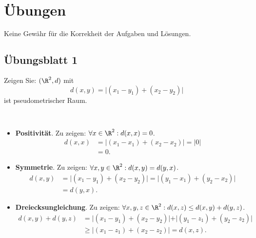 \chapter{Übungen}
Keine Gewähr für die Korrekheit der Aufgaben und Lösungen.

\section{Übungsblatt 1}
\setcounter{problemcounter}{0}

\begin{assignment}
  Zeigen Sie: \( (\R^2, d) \) mit
  \begin{equation*}
    d(x,y) = \vert (x_1-y_1)+(x_2-y_2) \vert
  \end{equation*}
  ist pseudometrischer Raum.
\end{assignment}
\begin{solution}
  \
  \begin{itemize}
    \item \textbf{Positivität}. Zu zeigen: \( \forall x \in \R^2: d(x,x) = 0 \).
    \begin{align*}
      d(x,x) &= \vert (x_1-x_1)+(x_2-x_2) \vert = \vert 0 \vert \\
      &= 0\text{.}
    \end{align*}
    
    \item \textbf{Symmetrie}. Zu zeigen: \( \forall x, y \in \R^2: d(x,y) = d(y,x) \).
    \begin{align*}
      d(x,y) &= \vert (x_1-y_1)+(x_2-y_2) \vert = \vert (y_1-x_1)+(y_2-x_2) \vert \\
      &= d(y,x)\text{.}
    \end{align*}
    
    \item \textbf{Dreiecksungleichung}. Zu zeigen: \( \forall x,y,z \in \R^2: d(x,z) \leq d(x,y) + d(y,z) \).
    \begin{align*}
      d(x,y) + d(y,z) &= \vert (x_1-y_1)+(x_2-y_2) \vert + \vert (y_1-z_1)+(y_2-z_2) \vert \\
      &\geq \vert (x_1-z_1) + (x_2 - z_2) \vert = d(x,z)\text{.}
    \end{align*}
  \end{itemize}
\end{solution}

